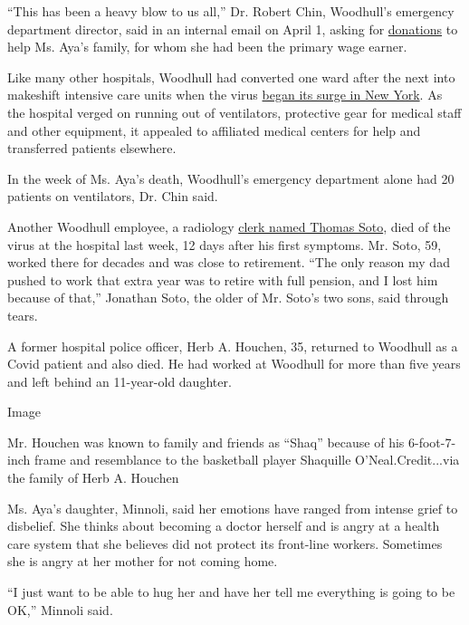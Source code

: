 ``This has been a heavy blow to us all,'' Dr. Robert Chin, Woodhull's
emergency department director, said in an internal email on April 1,
asking for
\href{https://www.gofundme.com/f/in-memory-of-madhvi-aya?utm_source=customer\&utm_medium=email\&utm_campaign=m_pd+share-sheet}{donations}
to help Ms. Aya's family, for whom she had been the primary wage earner.

Like many other hospitals, Woodhull had converted one ward after the
next into makeshift intensive care units when the virus
\href{https://www.nytimes3xbfgragh.onion/2020/03/20/nyregion/ny-coronavirus-hospitals.html?searchResultPosition=3}{began
its surge in New York}. As the hospital verged on running out of
ventilators, protective gear for medical staff and other equipment, it
appealed to affiliated medical centers for help and transferred patients
elsewhere.

In the week of Ms. Aya's death, Woodhull's emergency department alone
had 20 patients on ventilators, Dr. Chin said.

Another Woodhull employee, a radiology
\href{https://www.facebookcorewwwi.onion/permalink.php?story_fbid=2944721018928457\&id=100001717633057}{clerk
named Thomas Soto}, died of the virus at the hospital last week, 12 days
after his first symptoms. Mr. Soto, 59, worked there for decades and was
close to retirement. ``The only reason my dad pushed to work that extra
year was to retire with full pension, and I lost him because of that,''
Jonathan Soto, the older of Mr. Soto's two sons, said through tears.

A former hospital police officer, Herb A. Houchen, 35, returned to
Woodhull as a Covid patient and also died. He had worked at Woodhull for
more than five years and left behind an 11-year-old daughter.

Image

Mr. Houchen was known to family and friends as ``Shaq'' because of his
6-foot-7-inch frame and resemblance to the basketball player Shaquille
O'Neal.Credit...via the family of Herb A. Houchen

Ms. Aya's daughter, Minnoli, said her emotions have ranged from intense
grief to disbelief. She thinks about becoming a doctor herself and is
angry at a health care system that she believes did not protect its
front-line workers. Sometimes she is angry at her mother for not coming
home.

``I just want to be able to hug her and have her tell me everything is
going to be OK,'' Minnoli said.

